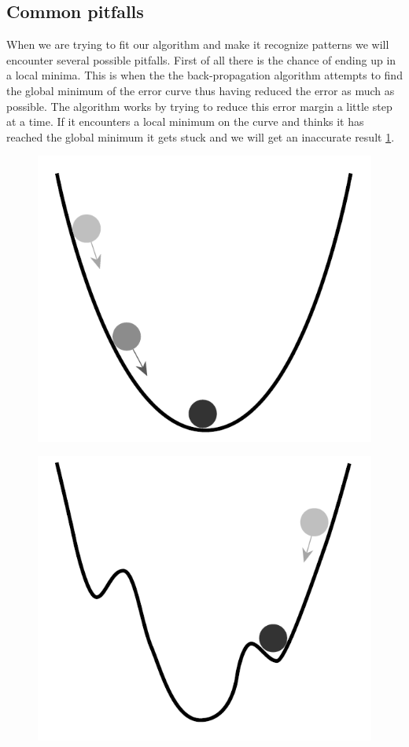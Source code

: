 \subsection{Common pitfalls}
When we are trying to fit our algorithm and make it recognize patterns we will encounter several possible pitfalls. First of all there is the chance of ending up in a local minima. This is when the the back-propagation algorithm attempts to find the global minimum of the error curve thus having reduced the error as much as possible. The algorithm works by trying to reduce this error margin a little step at a time. If it encounters a local minimum on the curve and thinks it has reached the global minimum it gets stuck and we will get an inaccurate result \ref{fig:localMinimum}. 

\begin{figure}
\centering
\begin{minipage}{.5\textwidth}
  \centering
  \includegraphics[width=.4\linewidth]{billeder/globalMinimum.png}
  \label{fig:globalMinimum}
\end{minipage}%
\begin{minipage}{.5\textwidth}
  \centering
  \includegraphics[width=.4\linewidth]{billeder/localMinimum.png}
  \label{fig:localMinimum}
\end{minipage}
\end{figure}

